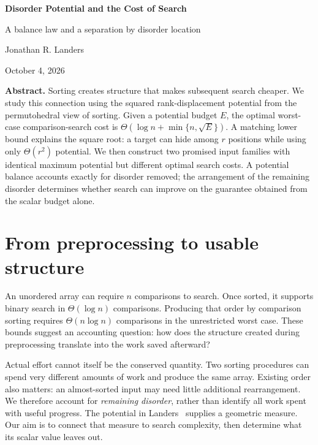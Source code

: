 \documentclass[10pt,letterpaper]{article}
\begin{document}
\thispagestyle{plain}
\begin{center}
{\LARGE\bfseries Disorder Potential and the Cost of Search}\par
\vspace{4pt}
{\large A balance law and a separation by disorder location}\par
\vspace{6pt}
Jonathan R. Landers\par
\small October 4, 2026
\end{center}
\vspace{-3pt}
\textbf{Abstract.} Sorting creates structure that makes subsequent search cheaper. We study
this connection using the squared rank-displacement potential from the permutohedral
view of sorting. Given a potential budget $E$, the optimal worst-case comparison-search
cost is $\Theta(\log n+\min\{n,\sqrt E\})$. A matching lower bound explains the square root:
a target can hide among $r$ positions while using only $\Theta(r^2)$ potential. We then
construct two promised input families with identical maximum potential but different
optimal search costs. A potential balance accounts exactly for disorder removed;
the arrangement of the remaining disorder determines whether search can improve on
the guarantee obtained from the scalar budget alone.

\section{From preprocessing to usable structure}
An unordered array can require $n$ comparisons to search. Once sorted, it supports
binary search in $\Theta(\log n)$ comparisons. Producing that order by comparison sorting
requires $\Theta(n\log n)$ comparisons in the unrestricted worst case. These bounds suggest
an accounting question: how does the structure created during preprocessing translate
into the work saved afterward?

Actual effort cannot itself be the conserved quantity. Two sorting procedures can spend
very different amounts of work and produce the same array. Existing order also matters:
an almost-sorted input may need little additional rearrangement. We therefore account for
\emph{remaining disorder}, rather than identify all work spent with useful progress.
The potential in Landers~\cite{landers} supplies a geometric measure. Our aim is to connect
that measure to search complexity, then determine what its scalar value leaves out.
\end{document}

